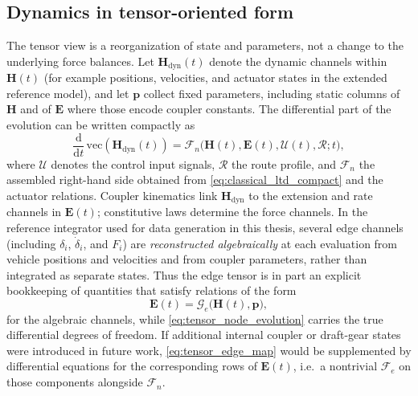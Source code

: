 \subsection{Dynamics in tensor-oriented form}
\label{sec:tensor_dynamics_form}

The tensor view is a reorganization of state and parameters, not a change to the underlying force balances.
Let $\mathbf{H}_{\mathrm{dyn}}(t)$ denote the dynamic channels within $\mathbf{H}(t)$ (for example positions, velocities, and actuator states in the extended reference model), and let $\mathbf{p}$ collect fixed parameters, including static columns of $\mathbf{H}$ and of $\mathbf{E}$ where those encode coupler constants.
The differential part of the evolution can be written compactly as
\begin{equation}
    \frac{\mathrm{d}}{\mathrm{d}t}\,\mathrm{vec}\!\left(\mathbf{H}_{\mathrm{dyn}}(t)\right)
    = \mathcal{F}_n\bigl(\mathbf{H}(t), \mathbf{E}(t), \mathcal{U}(t), \mathcal{R}; t\bigr),
    \label{eq:tensor_node_evolution}
\end{equation}
where $\mathcal{U}$ denotes the control input signals, $\mathcal{R}$ the route profile, and $\mathcal{F}_n$ the assembled right-hand side obtained from \cref{eq:classical_ltd_compact} and the actuator relations.
Coupler kinematics link $\mathbf{H}_{\mathrm{dyn}}$ to the extension and rate channels in $\mathbf{E}(t)$; constitutive laws determine the force channels.
In the reference integrator used for data generation in this thesis, several edge channels (including $\delta_i$, $\dot{\delta}_i$, and $F_i$) are \emph{reconstructed algebraically} at each evaluation from vehicle positions and velocities and from coupler parameters, rather than integrated as separate states.
Thus the edge tensor is in part an explicit bookkeeping of quantities that satisfy relations of the form
\begin{equation}
    \mathbf{E}(t) = \mathcal{G}_e\bigl(\mathbf{H}(t), \mathbf{p}\bigr),
    \label{eq:tensor_edge_map}
\end{equation}
for the algebraic channels, while \cref{eq:tensor_node_evolution} carries the true differential degrees of freedom.
If additional internal coupler or draft-gear states were introduced in future work, \cref{eq:tensor_edge_map} would be supplemented by differential equations for the corresponding rows of $\mathbf{E}(t)$, i.e.\ a nontrivial $\mathcal{F}_e$ on those components alongside $\mathcal{F}_n$.

